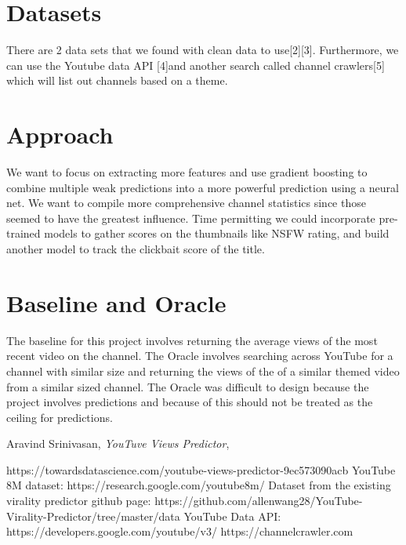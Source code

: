 \documentclass[12pt]{article}
\theoremstyle{definition}
\theoremstyle{remark}
\begin{document}
\section{Datasets}
There are 2 data sets that we found with clean data to use[2][3]. Furthermore, we can use the Youtube data API [4]and another search called channel crawlers[5] which will list out channels based on a theme.  


\section{Approach}
We want to focus on extracting more 
features and use gradient boosting to combine multiple weak predictions into a more
powerful prediction using a neural net. We want to compile more comprehensive channel statistics since
those seemed to have the greatest influence. Time permitting we could incorporate pre-trained models to gather scores on the thumbnails like NSFW rating, and build another model to track the clickbait score of the title.  

\section{Baseline and Oracle}
The baseline for this project involves returning the average views of the most recent video on the channel. The Oracle involves searching across YouTube for a channel with similar size and returning the views of the of a similar themed video from a similar sized channel. The Oracle was difficult to design because the project involves predictions and because of this should not be treated as the ceiling for predictions. 


\begin{thebibliography}{99}

 Aravind Srinivasan, \emph{YouTuve Views Predictor}, 

    \qquad https://towardsdatascience.com/youtube-views-predictor-9ec573090acb
YouTube 8M dataset: https://research.google.com/youtube8m/
Dataset from the existing virality predictor github page: https://github.com/allenwang28/YouTube-Virality-Predictor/tree/master/data
YouTube Data API: https://developers.google.com/youtube/v3/
https://channelcrawler.com 


\end{thebibliography}
\end{document}
